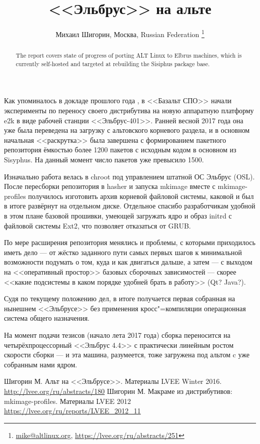 \documentclass[10pt, a5paper]{article}
\begin{document}
\title{<<Эльбрус>> на альте}
\author{Михаил Шигорин, Москва, Russian Federation \footnote{\url{mike@altlinux.org}, \url {https://lvee.org/ru/abstracts/251}}}
\maketitle
\begin{abstract}
The report covers state of progress of porting ALT Linux to Elbrus machines, which is currently self-hosted and targeted at rebuilding the Sisiphus package base.
\end{abstract}
Как упоминалось в докладе прошлого года \cite{Shigorin1}, в <<Базальт СПО>> начали эксперименты по переносу своего дистрибутива на новую аппаратную платформу e2k в виде рабочей станции <<Эльбрус-401>>. Ранней весной 2017 года она уже была переведена на загрузку с альтовского корневого раздела, и в основном начальная <<раскрутка>> была завершена с формированием пакетного репозитория ёмкостью более 1200 пакетов с исходным кодом в основном из Sisyphus. На данный момент число пакетов уже превысило 1500.

Изначально работа велась в chroot под управлением штатной ОС Эльбрус (OSL). После пересборки репозитория в hasher \cite{Shigorin1} и запуска mkimage вместе с mkimage-profiles \cite{Shigorin2} получилось изготовить архив корневой файловой системы, каковой и был в итоге развёрнут на отдельном диске. Отдельное спасибо разработчикам удобной в этом плане базовой прошивки, умеющей загружать ядро и образ initrd с файловой системы Ext2, что позволяет отказаться от GRUB. 

По мере расширения репозитория менялись и проблемы, с которыми приходилось иметь дело --- от жёстко заданного пути самых первых шагов к минимальной возможности подумать о том, куда и как двигаться дальше, а затем --- с выходом на <<оперативный простор>> базовых сборочных зависимостей --- скорее <<какие подсистемы в каком порядке удобней брать в работу>> (Qt? Java?).

Судя по текущему положению дел, в итоге получается первая собранная на нынешнем <<Эльбрусе>> без применения кросс"=компиляции операционная система общего назначения.

На момент подачи тезисов (начало лета 2017 года) сборка переносится на четырёхпроцессорный <<Эльбрус 4.4>> с практически линейным ростом скорости сборки --- и эта машина, разумеется, тоже загружена под альтом c уже собранным нами ядром.

\begin{thebibliography}{99}
   Шигорин М. Альт на <<Эльбрусе>>. Материалы LVEE Winter 2016. \url{http://lvee.org/ru/abstracts/180}
   Шигорин М. Макраме из дистрибутивов: mkimage-profiles. Материалы LVEE 2012 \url{https://lvee.org/ru/reports/LVEE_2012_11}
\end{thebibliography}
\end{document}
